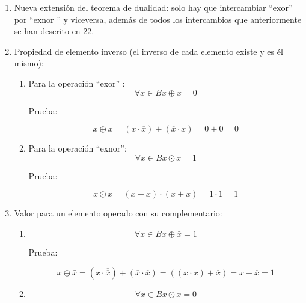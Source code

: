 \begin{enumerate}
\begin{enumerate}
\begin{enumerate}
      \begin{enumerate}
      \def\labelenumiv{\arabic{enumiv}.}
      \tightlist
      \item
        Definición del operador ``exor'':
        \[{x \oplus y}{: =}{{{({x \cdot \bar{y}})} + {({\bar{x} \cdot y})}} = {{({x + y})} \cdot {({\bar{x} + \bar{y}})}}}\]
      \item
        Definición del operador ``exnor'':
        \[{x \odot y}{: =}{{{({x + \bar{y}})} \cdot {({\bar{x} + y})}} = {{({x \cdot y})} + {({\bar{x} \cdot \bar{y}})}}}\]
      \end{enumerate}
    \item
      Nueva extensión del teorema de dualidad: solo hay que intercambiar
      ``exor'' por ``ex\-nor '' y viceversa, además de todos los
      intercambios que anteriormente se han des\-crito en 22.
    \item
      Propiedad de elemento inverso (el inverso de cada elemento existe
      y es él mismo):

      \begin{enumerate}
      \def\labelenumiv{\arabic{enumiv}.}
      \item
        Para la operación ``exor'' :
        \[\forall{x \in B}x \oplus {x = 0}\]

        Prueba:

        \[x \oplus {{{x = {{({x \cdot \overline{x}})} + {({\overline{x} \cdot x})}}} = {0 + 0}} = 0}\]
      \item
        Para la operación ``exnor'': \[\forall{x \in B}x \odot {x = 1}\]

        Prueba:

        \[x \odot {{{x = {{({x + \overline{x}})} \cdot {({\overline{x} + x})}}} = {1 \cdot 1}} = 1}\]
      \end{enumerate}
    \item
      Valor para un elemento operado con su complementario:

      \begin{enumerate}
      \def\labelenumiv{\arabic{enumiv}.}
      \item
        \[\forall{x \in B}x \oplus {\bar{x} = 1}\]

        Prueba:

        \[x \oplus {{{{\bar{x} = {{({x \cdot \overline{\overline{x}}})} + {({\overline{x} \cdot \overline{x}})}}} = {({{({x \cdot x})} + \overline{x}})}} = {x + \overline{x}}} = 1}\]
      \item
        \[\forall{x \in B}x \odot {\bar{x} = 0}\]


\end{enumerate}
\end{enumerate}
\end{enumerate}
\end{enumerate}
